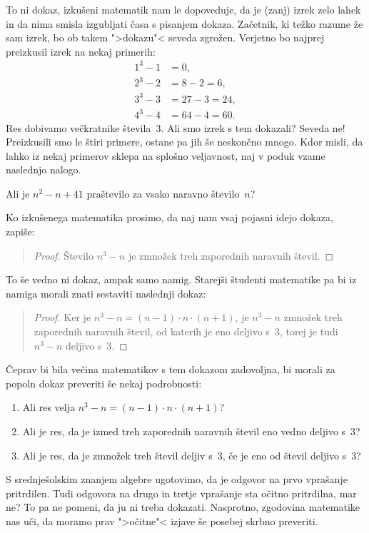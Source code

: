 \noindent
To ni dokaz, izkušeni matematik nam le dopoveduje, da je (zanj) izrek
zelo lahek in da nima smisla izgubljati časa s pisanjem dokaza.
Začetnik, ki težko razume že sam izrek, bo ob takem ">dokazu"< seveda
zgrožen. Verjetno bo najprej preizkusil izrek na nekaj primerih:
%
\begin{align*}
  1^3 - 1 &= 0,\\
  2^3 - 2 &= 8 - 2 = 6,\\
  3^3 - 3 &= 27 - 3 = 24,\\
  4^3 - 4 &= 64 - 4 = 60.
\end{align*}
%
Res dobivamo večkratnike števila~$3$. Ali smo izrek s tem dokazali? Seveda ne!
Preizkusili smo le štiri primere, ostane pa jih še neskončno mnogo. Kdor
misli, da lahko iz nekaj primerov sklepa na splošno veljavnost, naj v poduk
vzame naslednjo nalogo.

\begin{vaja}
  Ali je $n^2 - n + 41$ praštevilo za vsako naravno število~$n$?
\end{vaja}

\noindent
Ko izkušenega matematika prosimo, da naj nam vsaj pojasni idejo dokaza,
zapiše:

\begin{quote}
  \begin{proof}
    Število $n^3 - n$ je zmnožek treh zaporednih naravnih števil.
  \end{proof}
\end{quote}

\noindent
To še vedno ni dokaz, ampak samo namig. Starejši študenti matematike pa
bi iz namiga morali znati sestaviti naslednji dokaz:

\begin{quote}
  \begin{proof}
    Ker je $n^3 - n = (n-1) \cdot n \cdot (n+1)$, je $n^3 - n$ zmnožek
    treh zaporednih naravnih števil, od katerih je eno deljivo s~$3$,
    torej je tudi $n^3 - n$ deljivo s~$3$.
  \end{proof}
\end{quote}

\noindent
Čeprav bi bila
večina matematikov s tem dokazom zadovoljna, bi morali za popoln dokaz
preveriti še nekaj podrobnosti:
%
\begin{enumerate}
\item Ali res velja $n^3 - n = (n-1) \cdot n \cdot (n+1)$?
\item Ali je res, da je izmed treh zaporednih naravnih števil eno
  vedno deljivo s~$3$?
\item Ali je res, da je zmnožek treh števil deljiv s~$3$, če je eno od
  števil deljivo s~$3$?
\end{enumerate}
%
S srednješolskim znanjem algebre ugotovimo, da je odgovor na prvo
vprašanje pritrdilen. Tudi odgovora na drugo in tretje vprašanje sta
očitno pritrdilna, mar ne? To pa ne pomeni, da ju ni treba dokazati.
Nasprotno, zgodovina matematike nas uči, da moramo prav ">očitne"<
izjave še posebej skrbno preveriti.

